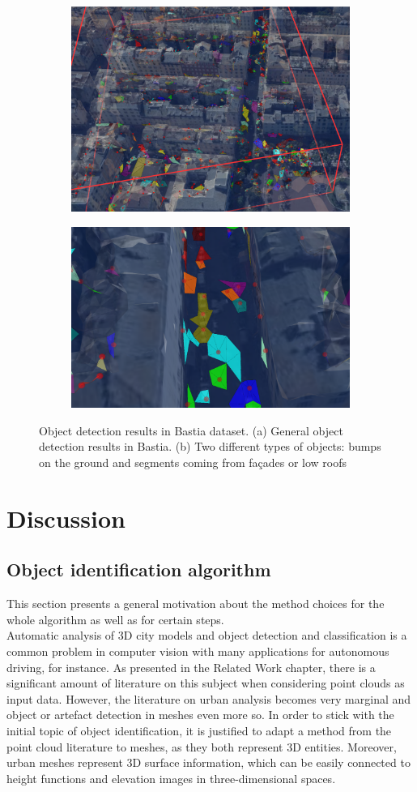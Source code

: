 \documentclass{kththesis}
\begin{document}
\begin{figure}[H]
\centering
\begin{subfigure}{.5\textwidth}
  \centering
  \includegraphics[width=.45\linewidth]{images/Object_res/objects_from_local_maxima.png}
  \label{fig:object_detection_global}
\end{subfigure}%
\begin{subfigure}{.5\textwidth}
  \centering
  \includegraphics[width=.55\linewidth]{images/Object_res/types_of_objects_detected.png}
  \label{fig:object_detection_closeup}
\end{subfigure}
\caption{Object detection results in Bastia dataset. (a) General object detection results in Bastia. (b) Two different types of objects: bumps on the ground and segments coming from façades or low roofs}
\label{fig:object_detection}
\end{figure}



\chapter{Discussion}
\section{Object identification algorithm}
This section presents a general motivation about the method choices for the whole algorithm as well as for certain steps. \\
Automatic analysis of 3D city models and object detection and classification is a common problem in computer vision with many applications for autonomous driving, for instance. As presented in the Related Work chapter, there is a significant amount of literature on this subject when considering point clouds as input data. However, the literature on urban analysis becomes very marginal and object or artefact detection in meshes  even more so. In order to stick with the initial topic of object identification, it is justified to adapt a method from the point cloud literature to meshes, as they both represent 3D entities. Moreover, urban meshes represent 3D surface information, which can be easily connected to height functions and elevation images in three-dimensional spaces.
\end{document}
